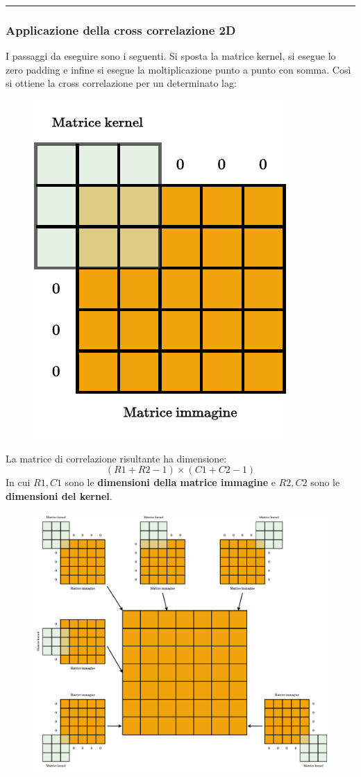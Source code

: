 \documentclass[a4paper]{article}
\newcommand{\longline}{\noindent\rule{\textwidth}{0.4pt}}
\begin{document}
	\longline
	
	\subsubsection{Applicazione della cross correlazione 2D}
	
	I passaggi da eseguire sono i seguenti. Si sposta la matrice kernel, si esegue lo zero padding e infine si esegue la moltiplicazione punto a punto con somma. Così si ottiene la cross correlazione per un determinato lag:
	\begin{figure}[!htp]
		\centering
		\includegraphics[width=.5\textwidth]{img/lab/cross-correlazione2D-1.pdf}
	\end{figure}\newpage
	
	\noindent
	La matrice di correlazione risultante ha dimensione:
	\begin{equation*}
		\left(R1 + R2 - 1\right) \times \left(C1 + C2 - 1\right)
	\end{equation*}
	In cui $R1,C1$ sono le \textbf{dimensioni della matrice immagine} e $R2,C2$ sono le \textbf{dimensioni del kernel}.
	\begin{figure}[!htp]
		\centering
		\includegraphics[width=\textwidth]{img/lab/cross-correlazione2D-2.pdf}
	\end{figure}\newpage
	
\end{document}
